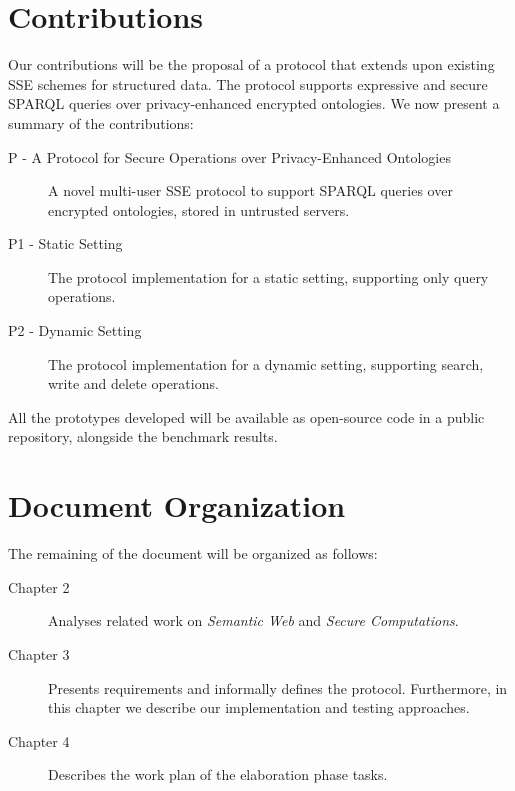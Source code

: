 \section{Contributions}
\label{ch1:sec:contributions}

Our contributions will be the proposal of a protocol that extends upon existing \gls{SSE} schemes for structured data. The protocol supports expressive and secure \gls{SPARQL} queries over privacy-enhanced encrypted ontologies. We now present a summary of the contributions:

\begin{description}
    \item [P - A Protocol for Secure Operations over Privacy-Enhanced Ontologies] A novel multi-user \gls{SSE} protocol to support \gls{SPARQL} queries over encrypted ontologies, stored in untrusted servers.
    \item [P1 - Static Setting] The protocol implementation for a static setting, supporting only query operations.
    \item [P2 - Dynamic Setting] The protocol implementation for a dynamic setting, supporting search, write and delete operations.
\end{description}

All the prototypes developed will be available as open-source code in a public repository, alongside the benchmark results.

\section{Document Organization}
\label{ch1:sec:organization}

The remaining of the document will be organized as follows:

\begin{description}
    \item [Chapter 2] Analyses related work on \emph{Semantic Web} and \emph{Secure Computations}.
    \item [Chapter 3] Presents requirements and informally defines the protocol. Furthermore, in this chapter we describe our implementation and testing approaches.
    \item [Chapter 4] Describes the work plan of the elaboration phase tasks.
\end{description}
